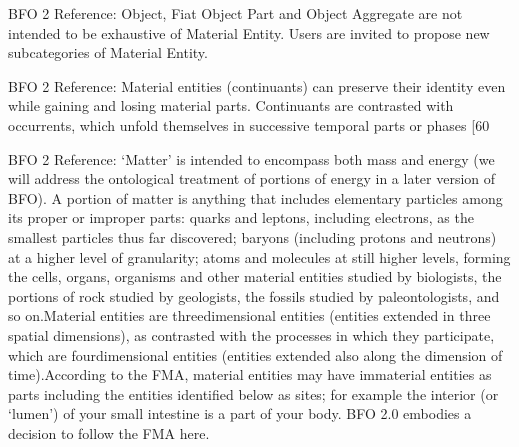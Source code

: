 \documentclass[letterpaper,10pt,english]{sphinxmanual}
\begin{document}
\begin{sphinxShadowBox}

\sphinxAtStartPar
BFO 2 Reference: Object, Fiat Object Part and Object Aggregate are not intended to be exhaustive of Material Entity. Users are invited to propose new subcategories of Material Entity.

\sphinxAtStartPar
BFO 2 Reference: Material entities (continuants) can preserve their identity even while gaining and losing material parts. Continuants are contrasted with occurrents, which unfold themselves in successive temporal parts or phases {[}60

\sphinxAtStartPar
BFO 2 Reference: ‘Matter’ is intended to encompass both mass and energy (we will address the ontological treatment of portions of energy in a later version of BFO). A portion of matter is anything that includes elementary particles among its proper or improper parts: quarks and leptons, including electrons, as the smallest particles thus far discovered; baryons (including protons and neutrons) at a higher level of granularity; atoms and molecules at still higher levels, forming the cells, organs, organisms and other material entities studied by biologists, the portions of rock studied by geologists, the fossils studied by paleontologists, and so on.Material entities are three\sphinxhyphen{}dimensional entities (entities extended in three spatial dimensions), as contrasted with the processes in which they participate, which are four\sphinxhyphen{}dimensional entities (entities extended also along the dimension of time).According to the FMA, material entities may have immaterial entities as parts \textendash{} including the entities identified below as sites; for example the interior (or ‘lumen’) of your small intestine is a part of your body. BFO 2.0 embodies a decision to follow the FMA here.
\end{sphinxShadowBox}

\begin{sphinxShadowBox}

\sphinxAtStartPar
{}
\end{sphinxShadowBox}
\begin{quote}

\ignorespaces \end{quote}
\end{document}
